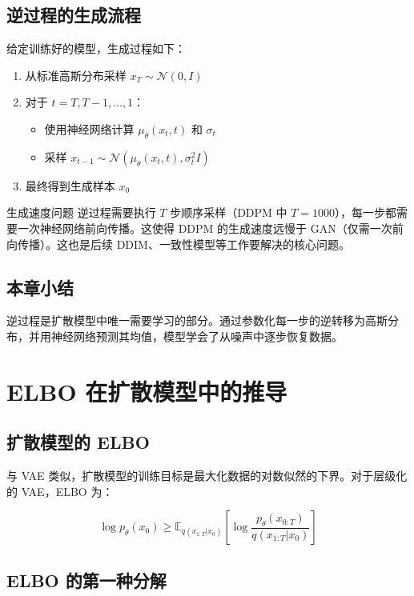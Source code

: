 \documentclass[a4paper]{article}
\begin{document}
\subsection{逆过程的生成流程}

给定训练好的模型，生成过程如下：

\begin{enumerate}
    \item 从标准高斯分布采样 $x_T \sim \mathcal{N}(0, I)$
    \item 对于 $t = T, T-1, \ldots, 1$：
    \begin{itemize}
        \item 使用神经网络计算 $\mu_\theta(x_t, t)$ 和 $\sigma_t$
        \item 采样 $x_{t-1} \sim \mathcal{N}(\mu_\theta(x_t, t), \sigma_t^2 I)$
    \end{itemize}
    \item 最终得到生成样本 $x_0$
\end{enumerate}

\begin{warningbox}{生成速度问题}
逆过程需要执行 $T$ 步顺序采样（DDPM 中 $T = 1000$），每一步都需要一次神经网络前向传播。这使得 DDPM 的生成速度远慢于 GAN（仅需一次前向传播）。这也是后续 DDIM、一致性模型等工作要解决的核心问题。
\end{warningbox}

\subsection{本章小结}

逆过程是扩散模型中唯一需要学习的部分。通过参数化每一步的逆转移为高斯分布，并用神经网络预测其均值，模型学会了从噪声中逐步恢复数据。


\section{ELBO 在扩散模型中的推导}

\subsection{扩散模型的 ELBO}

与 VAE 类似，扩散模型的训练目标是最大化数据的对数似然的下界。对于层级化的 VAE，ELBO 为：

$$\log p_\theta(x_0) \geq \mathbb{E}_{q(x_{1:T}|x_0)} \left[ \log \frac{p_\theta(x_{0:T})}{q(x_{1:T}|x_0)} \right]$$

\subsection{ELBO 的第一种分解}
\end{document}
